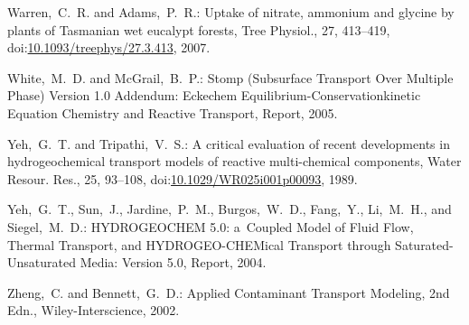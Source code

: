 \documentclass[gmd,noline]{copernicus}
\begin{document}
\begin{thebibliography}{55}
Warren,~C.~R. and Adams,~P.~R.:
Uptake of nitrate, ammonium and glycine by plants of Tasmanian wet eucalypt forests,
Tree Physiol.,
27, 413--419,
doi:\href{http://dx.doi.org/10.1093/treephys/27.3.413}{10.1093/treephys/27.3.413}, 2007.


White,~M.~D. and McGrail,~B.~P.:
Stomp (Subsurface Transport Over Multiple Phase) Version 1.0 Addendum: Eckechem Equilibrium-Conservationkinetic Equation Chemistry and Reactive Transport, Report,
  2005.

Yeh,~G.~T. and Tripathi,~V.~S.:
A critical evaluation of recent developments in hydrogeochemical transport models of reactive multi-chemical components,
Water Resour. Res.,
25, 93--108,
doi:\href{http://dx.doi.org/10.1029/WR025i001p00093}{10.1029/WR025i001p00093}, 1989.


Yeh,~G.~T., Sun,~J., Jardine,~P.~M., Burgos,~W.~D., Fang,~Y., Li,~M.~H., and Siegel,~M.~D.:
HYDROGEOCHEM 5.0: a~Coupled Model of Fluid Flow, Thermal Transport, and HYDROGEO-CHEMical Transport through Saturated-Unsaturated Media: Version 5.0, Report,
  2004.

Zheng,~C. and Bennett,~G.~D.: Applied Contaminant Transport Modeling, 2nd
Edn., Wiley-Interscience, 2002.

\end{thebibliography}
\end{document}
